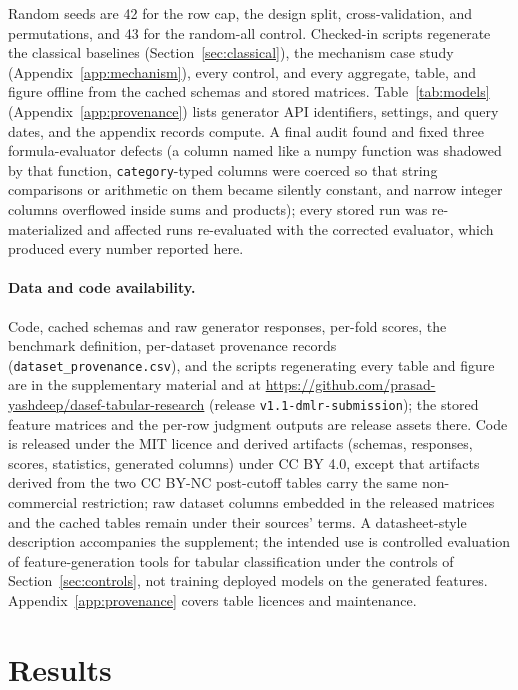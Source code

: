 Random seeds are 42 for the row cap, the design split, cross-validation, and permutations, and 43 for the random-all control. Checked-in scripts regenerate the classical baselines (Section~\ref{sec:classical}), the mechanism case study (Appendix~\ref{app:mechanism}), every control, and every aggregate, table, and figure offline from the cached schemas and stored matrices. Table~\ref{tab:models} (Appendix~\ref{app:provenance}) lists generator API identifiers, settings, and query dates, and the appendix records compute. A final audit found and fixed three formula-evaluator defects (a column named like a numpy function was shadowed by that function, \texttt{category}-typed columns were coerced so that string comparisons or arithmetic on them became silently constant, and narrow integer columns overflowed inside sums and products); every stored run was re-materialized and affected runs re-evaluated with the corrected evaluator, which produced every number reported here.

\paragraph{Data and code availability.}

Code, cached schemas and raw generator responses, per-fold scores, the benchmark definition, per-dataset provenance records (\texttt{dataset\_provenance.csv}), and the scripts regenerating every table and figure are in the supplementary material and at \url{https://github.com/prasad-yashdeep/dasef-tabular-research} (release \texttt{v1.1-dmlr-submission}); the stored feature matrices and the per-row judgment outputs are release assets there. Code is released under the MIT licence and derived artifacts (schemas, responses, scores, statistics, generated columns) under CC BY 4.0, except that artifacts derived from the two CC BY-NC post-cutoff tables carry the same non-commercial restriction; raw dataset columns embedded in the released matrices and the cached tables remain under their sources' terms. A datasheet-style description accompanies the supplement; the intended use is controlled evaluation of feature-generation tools for tabular classification under the controls of Section~\ref{sec:controls}, not training deployed models on the generated features. Appendix~\ref{app:provenance} covers table licences and maintenance.

\section{Results}\label{sec:results}

